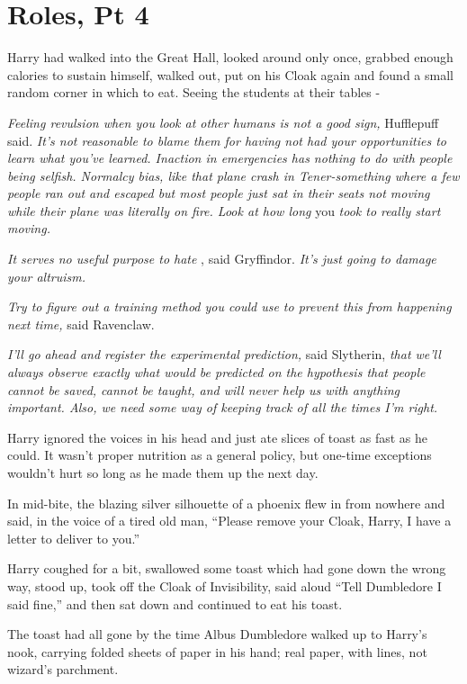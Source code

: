 \chapter{Roles, Pt 4}

Harry had walked into the Great Hall, looked around only once, grabbed
enough calories to sustain himself, walked out, put on his Cloak again
and found a small random corner in which to eat. Seeing the students at
their tables -

\emph{Feeling revulsion when you look at other humans is not a good
sign,} Hufflepuff said. \emph{It's not reasonable to blame them for
having not had your opportunities to learn what you've learned. Inaction
in emergencies has nothing to do with people being selfish. Normalcy
bias, like that plane crash in Tener-something where a few people ran
out and escaped but most people just sat in their seats not moving while
their plane was literally on fire. Look at how long} you \emph{took to
really start moving.}

\emph{It serves no useful purpose to hate} , said Gryffindor. \emph{It's
just going to damage your altruism.}

\emph{Try to figure out a training method you could use to prevent this
from happening next time,} said Ravenclaw.

\emph{I'll go ahead and register the experimental prediction,} said
Slytherin, \emph{that we'll always observe exactly what would be
predicted on the hypothesis that people cannot be saved, cannot be
taught, and will never help us with anything important. Also, we need
some way of keeping track of all the times I'm right.}

Harry ignored the voices in his head and just ate slices of toast as
fast as he could. It wasn't proper nutrition as a general policy, but
one-time exceptions wouldn't hurt so long as he made them up the next
day.

In mid-bite, the blazing silver silhouette of a phoenix flew in from
nowhere and said, in the voice of a tired old man, ``Please remove your
Cloak, Harry, I have a letter to deliver to you.''

Harry coughed for a bit, swallowed some toast which had gone down the
wrong way, stood up, took off the Cloak of Invisibility, said aloud
``Tell Dumbledore I said fine,'' and then sat down and continued to eat
his toast.

The toast had all gone by the time Albus Dumbledore walked up to Harry's
nook, carrying folded sheets of paper in his hand; real paper, with
lines, not wizard's parchment.


